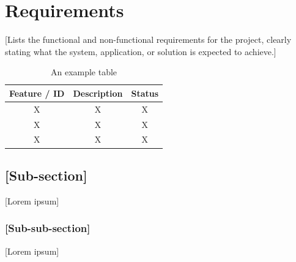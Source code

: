 \chapter{Requirements}
\label{chap:requirements}

[Lists the functional and non-functional requirements for the project, clearly stating what the system, application, or solution is expected to achieve.]

\begin{table}[htbp]
\centering
\caption{An example table}
\label{tab:example_table}
\begin{tabular}{ccc}
\toprule
\textbf{Feature / ID} & \textbf{Description} & \textbf{Status} \\
\midrule
X & X & X \\
X & X & X \\
X & X & X \\
\bottomrule
\end{tabular}
\end{table}

\section{[Sub-section]}
\label{sec:requirements_subsection}
[Lorem ipsum]

\subsection{[Sub-sub-section]}
\label{subsec:requirements_subsubsection}
[Lorem ipsum]

